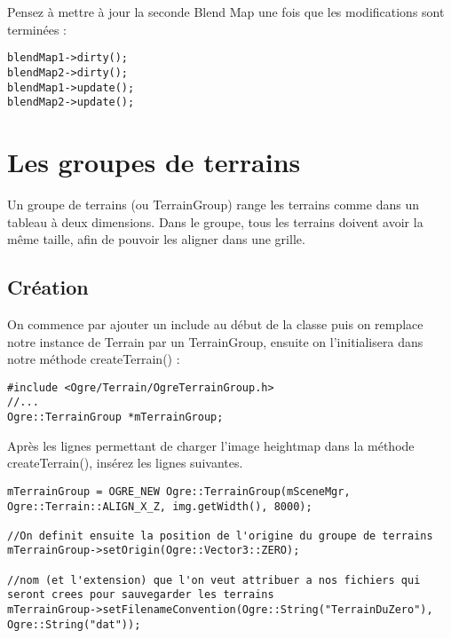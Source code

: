 \documentclass[10pt,a4paper]{report}
\begin{document}
Pensez \`a mettre \`a jour la seconde Blend Map une fois que les modifications sont termin\'ees :

\begin{lstlisting}[caption={}]
blendMap1->dirty();
blendMap2->dirty();
blendMap1->update();
blendMap2->update();
\end{lstlisting}








\section{Les groupes de terrains}

Un groupe de terrains (ou TerrainGroup) range les terrains comme dans un tableau \`a deux dimensions. Dans le groupe, tous les terrains doivent avoir la m\^eme taille, afin de pouvoir les aligner dans une grille.



\subsection{Cr\'eation}

On commence par ajouter un include au d\'ebut de la classe puis on remplace notre instance de Terrain par un TerrainGroup, ensuite on l'initialisera dans notre m\'ethode createTerrain() :

\begin{lstlisting}[caption={TerrainGroup: include et cr\'eation}]
#include <Ogre/Terrain/OgreTerrainGroup.h>
//...
Ogre::TerrainGroup *mTerrainGroup;
\end{lstlisting}

Apr\`es les lignes permettant de charger l'image heightmap dans la m\'ethode createTerrain(), ins\'erez les lignes suivantes.

\begin{lstlisting}[caption={}]
mTerrainGroup = OGRE_NEW Ogre::TerrainGroup(mSceneMgr, Ogre::Terrain::ALIGN_X_Z, img.getWidth(), 8000);

//On definit ensuite la position de l'origine du groupe de terrains
mTerrainGroup->setOrigin(Ogre::Vector3::ZERO);

//nom (et l'extension) que l'on veut attribuer a nos fichiers qui seront crees pour sauvegarder les terrains
mTerrainGroup->setFilenameConvention(Ogre::String("TerrainDuZero"), Ogre::String("dat"));
\end{lstlisting}
\end{document}

